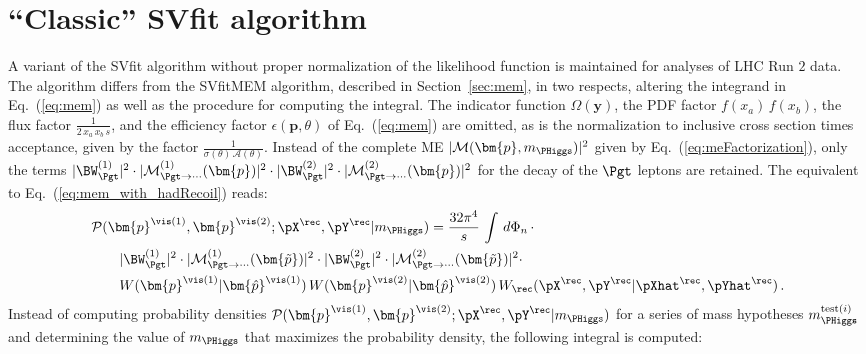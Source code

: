\section{``Classic'' SVfit algorithm}
\label{sec:classicSVfit}

A variant of the SVfit algorithm without proper normalization of the likelihood function is maintained for analyses of LHC Run $2$ data.
The algorithm differs from the SVfitMEM algorithm, described in Section~\ref{sec:mem}, in two respects,
altering the integrand in Eq.~(\ref{eq:mem}) as well as the procedure for computing the integral.
The indicator function $\Omega(\bm{y})$, the PDF factor $f(x_{a}) \, f(x_{b})$, the flux factor $\frac{1}{2 \, x_{a} \, x_{b} \, s}$,
and the efficiency factor $\epsilon(\bm{p},\theta)$ of Eq.~(\ref{eq:mem}) are omitted,
as is the normalization to inclusive cross section times acceptance, given by the factor $\frac{1}{\sigma(\theta) \, \mathcal{A}(\theta)}$.
Instead of the complete ME $\vert \mathcal{M}(\bm{p},m_{\PHiggs}) \vert^{2}$ given by Eq.~(\ref{eq:meFactorization}),
only the terms 
$\vert \BW_{\Pgt}^{(1)} \vert^{2} \cdot \vert \mathcal{M}^{(1)}_{\Pgt\to\cdots}(\bm{p}) \vert^{2} \cdot \vert \BW_{\Pgt}^{(2)} \vert^{2} \cdot \vert \mathcal{M}^{(2)}_{\Pgt\to\cdots}(\bm{p}) \vert^{2}$
for the decay of the $\Pgt$ leptons are retained.
The equivalent to Eq.~(\ref{eq:mem_with_hadRecoil}) reads:
\begin{align}
&
\mathcal{P}(\bm{p}^{\vis(1)},\bm{p}^{\vis(2)};\pX^{\rec},\pY^{\rec}|m_{\PHiggs})
= \frac{32\pi^{4}}{s} \, \int \, d\Phi_{n} \, \cdot \hspace{2cm} \nonumber \\
& \qquad \vert \BW^{(1)}_{\Pgt} \vert^{2} \cdot \vert \mathcal{M}^{(1)}_{\Pgt\to\cdots}(\bm{\tilde{p}}) \vert^{2} 
 \cdot \vert \BW^{(2)}_{\Pgt} \vert^{2} \cdot \vert \mathcal{M}^{(2)}_{\Pgt\to\cdots}(\bm{\tilde{p}}) \vert^{2} \cdot \nonumber \\
& \qquad W(\bm{p}^{\vis(1)}|\bm{\hat{p}}^{\vis(1)}) \, W(\bm{p}^{\vis(2)}|\bm{\hat{p}}^{\vis(2)}) \, W_{\rec}( \pX^{\rec},\pY^{\rec} | \pXhat^{\rec},\pYhat^{\rec} ) \, .
\label{eq:likelihood_with_hadRecoil}
\end{align}
Instead of computing probability densities $\mathcal{P}(\bm{p}^{\vis(1)},\bm{p}^{\vis(2)};\pX^{\rec},\pY^{\rec}|m_{\PHiggs})$ for a series of mass hypotheses $m_{\PHiggs}^{\textrm{test}(i)}$ 
and determining the value of $m_{\PHiggs}$ that maximizes the probability density,
the following integral is computed:
